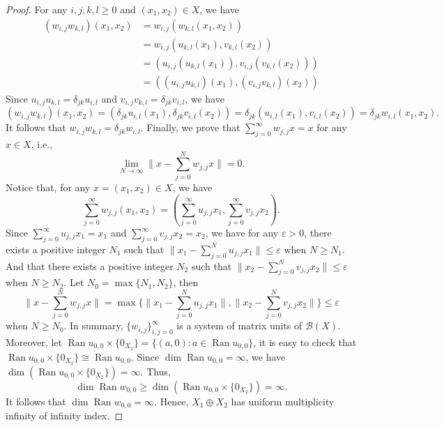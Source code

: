 \documentclass[12pt]{amsart}
\numberwithin{equation}{section}
\theoremstyle{plain}
\theoremstyle{definition}
\newcommand{\B}{{\mathcal{B}}}
\newcommand{\ran}{\operatorname{Ran}}
\begin{document}
\begin{proof}
For any $i,j,k,l\geq 0$ and $(x_1,x_2)\in X$, we have
\begin{align*}
(w_{i,j}w_{k,l})(x_1,x_2)
&=w_{i,j}(w_{k,l}(x_1,x_2))\\
&=w_{i,j}(u_{k,l}(x_1),v_{k,l}(x_2))\\
&=\left(u_{i,j}(u_{k,l}(x_1)),v_{i,j}(v_{k,l}(x_2))\right)\\
&=\left((u_{i,j}u_{k,l})(x_1),(v_{i,j}v_{k,l})(x_2)\right)
\end{align*}
Since $u_{i,j}u_{k,l}=\delta_{jk}u_{i,l}$ and $v_{i,j}v_{k,l}=\delta_{jk} v_{i,l}$, we have
$$(w_{i,j}w_{k,l})(x_1,x_2)=(\delta_{jk}u_{i,l}(x_1),\delta_{jk}v_{i,l}(x_2))=\delta_{jk}(u_{i,l}(x_1),v_{i,l}(x_2))=\delta_{jk}w_{i,l}(x_1,x_2).$$
It follows that $w_{i,j}w_{k,l}=\delta_{jk}w_{i,l}$.
Finally, we prove that $\sum_{j=0}^{\infty} w_{j,j}x=x$ for any $x\in X$, i.e.,
$$\lim_{N\rightarrow \infty}\|x-\sum_{j=0}^{N} w_{j,j}x\|=0.$$
Notice that, for any $x=(x_1,x_2)\in X$, we have
$$\sum_{j=0}^{\infty} w_{j,j}(x_1,x_2)=\left(\sum_{j=0}^{\infty}u_{j,j}x_1,\sum_{j=0}^{\infty}v_{j,j}x_2\right).$$
Since $\sum_{j=0}^{\infty}u_{j,j}x_1=x_1$ and $\sum_{j=0}^{\infty}v_{j,j}x_2=x_2$, we have for any $\varepsilon > 0$,
there exists a positive integer $N_1$ such that
$\|x_1-\sum_{j=0}^{N}u_{j,j}x_1\|\leq \varepsilon$
when $N\geq N_1$.
And that
there exists a positive integer $N_2$ such that
$\|x_2-\sum_{j=0}^{N}v_{j,j}x_2\|\leq \varepsilon$
when $N\geq N_2$.
Let $N_0=\max\{N_1,N_2\}$, then
$$\|x-\sum_{j=0}^{N}w_{j,j}x\|=\max\{\|x_1-\sum_{j=0}^{N}u_{j,j}x_1\|,\|x_2-\sum_{j=0}^{N}v_{j,j}x_2\|\}\leq \varepsilon$$
when $N\geq N_0$.
In summary, $\{w_{i,j}\}_{i,j=0}^{\infty}$ is a system of matrix units of $\B(X)$.
Moreover,
let
$\ran u_{0,0}\times \{0_{X_2}\}=\{(a,0):a\in \ran u_{0,0}\}$, it is easy to check that $\ran u_{0,0}\times \{0_{X_2}\}\cong \ran u_{0,0}$.
Since $\dim\ran u_{0,0}=\infty$, we have $\dim(\ran u_{0,0}\times \{0_{X_2}\})=\infty$.
Thus,
$$\dim\ran w_{0,0}\geq \dim(\ran u_{0,0}\times \{0_{X_2}\})=\infty.$$
It follows that $\dim\ran w_{0,0}=\infty$. Hence, $X_1\oplus X_2$ has uniform multiplicity infinity of infinity index.
\end{proof}
\end{document}
